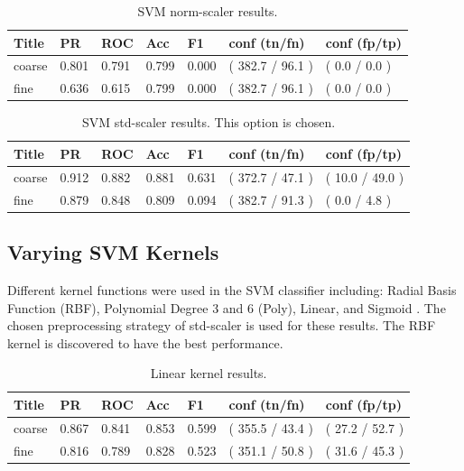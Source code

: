 \documentclass[ms]{nuthesis}
\begin{document}
\FloatBarrier
\begin{table}[H]
\centering
\caption{SVM norm-scaler results.}
\label{tab:SVMNorm}
\begin{tabular}{|l||l||l||l||l||l||l|}\toprule
Title & PR & ROC & Acc & F1 & conf (tn/fn) & conf (fp/tp) \\ \midrule
coarse & 0.801 & 0.791 & 0.799 & 0.000 & ( 382.7 / 96.1 ) & ( 0.0 / 0.0 ) \\
fine & 0.636 & 0.615 & 0.799 & 0.000 & ( 382.7 / 96.1 ) & ( 0.0 / 0.0 ) \\ \bottomrule
\end{tabular}
\end{table}
\FloatBarrier

\FloatBarrier
\begin{table}[H]
\centering
\caption{SVM std-scaler results. This option is chosen.}
\label{tab:SVMStandard}
\begin{tabular}{|l||l||l||l||l||l||l|}\toprule
Title & PR & ROC & Acc & F1 & conf (tn/fn) & conf (fp/tp) \\ \midrule
coarse & 0.912 & 0.882 & 0.881 & 0.631 & ( 372.7 / 47.1 ) & ( 10.0 / 49.0 ) \\
fine & 0.879 & 0.848 & 0.809 & 0.094 & ( 382.7 / 91.3 ) & ( 0.0 / 4.8 ) \\ \bottomrule
\end{tabular}
\end{table}
\FloatBarrier


\subsection{Varying SVM Kernels}
\par Different kernel functions were used in the SVM classifier
including: Radial Basis Function (RBF), Polynomial
Degree 3 and 6 (Poly), Linear, and Sigmoid \cite{scikit-learn}. The
chosen preprocessing strategy of
std-scaler is used for these results. The RBF kernel is discovered to have the
best performance.



\FloatBarrier
\begin{table}[H]
\centering
\caption{Linear kernel results.}
\label{tab:Linear}
\begin{tabular}{|l||l||l||l||l||l||l|}\toprule
Title & PR & ROC & Acc & F1 & conf (tn/fn) & conf (fp/tp) \\ \midrule
coarse & 0.867 & 0.841 & 0.853 & 0.599 & ( 355.5 / 43.4 ) & ( 27.2 / 52.7 ) \\
fine & 0.816 & 0.789 & 0.828 & 0.523 & ( 351.1 / 50.8 ) & ( 31.6 / 45.3 ) \\ \bottomrule
\end{tabular}
\end{table}
\FloatBarrier
\end{document}
